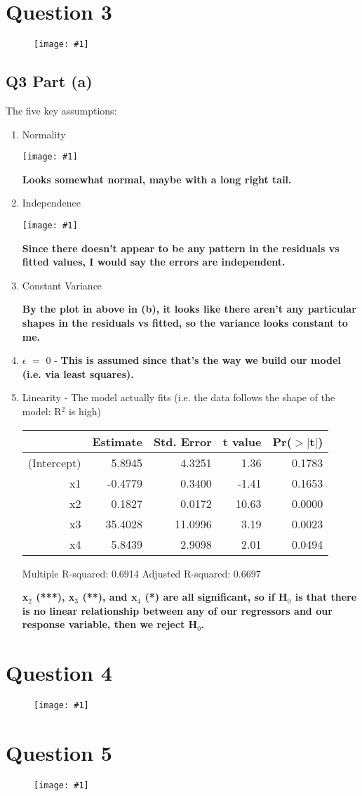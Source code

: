\documentclass{article}
\newcommand{\mt}[1]{\ensuremath{#1}}
\newcommand\bsc[2][\DefaultOpt]{%
  \def\DefaultOpt{#2}%
  \section[#1]{#2}%
}
\newcommand\ssc[2][\DefaultOpt]{%
  \def\DefaultOpt{#2}%
  \subsection[#1]{#2}%
}
\newcommand{\balist}{\begin{enumerate}[label=\alph*.]}
\newcommand{\elist}{\end{enumerate}}
\newcommand{\eql}{ \mt{\operatorname{=}} }
\newcommand{\uw}[2]{#1\mt{_{#2}}}
\newcommand{\txt}[1]{\text{#1}} %
\newcommand{\exv}[1]{\txt{E[}#1\txt{]}}
\newcommand{\simg}[1]{
  \texttt{[image: \#1]}
}
\newcommand{\wimg}[1]{
\begin{figure}[h]
  \texttt{[image: \#1]}
\end{figure}
}
\newcommand\tab[1][1cm]{\hspace*{#1}}
\begin{document}
\bsc{Question 3}{
\wimg{HW6Q3}

\ssc{Q3 Part (a)}{
The five key assumptions:

\balist
\item Normality

\simg{HW6Q3PAHist}

\textbf{Looks somewhat normal, maybe with a long right tail.}

\item Independence

\simg{HW6Q3PARes}

\textbf{Since there doesn't appear to be any pattern in the residuals vs fitted values, I would say the errors are independent.}

\item Constant Variance

\textbf{By the plot in above in (b), it looks like there aren't any particular shapes in the residuals vs fitted, so the variance looks constant to me.}

\item \exv{$\epsilon$} \eql 0 - \textbf{This is assumed since that's the way we build our model (i.e. via least squares).}

\item Linearity - The model actually fits (i.e. the data follows the shape of the model: R$^2$ is high)

\begin{table}[ht]
\centering
\begin{tabular}{rrrrr}
  \hline
 & Estimate & Std. Error & t value & Pr($>$$|$t$|$) \\ 
  \hline
(Intercept) & 5.8945 & 4.3251 & 1.36 & 0.1783 \\ 
  x1 & -0.4779 & 0.3400 & -1.41 & 0.1653 \\ 
  x2 & 0.1827 & 0.0172 & 10.63 & 0.0000 \\ 
  x3 & 35.4028 & 11.0996 & 3.19 & 0.0023 \\ 
  x4 & 5.8439 & 2.9098 & 2.01 & 0.0494 \\ 
   \hline
\end{tabular}
\end{table}

Multiple R-squared:  0.6914 \tab 	Adjusted R-squared:  0.6697

\textbf{\uw{x}{2} (***), \uw{x}{3} (**), and \uw{x}{4} (*) are all significant, so if \uw{H}{0} is that there is no linear relationship between any of our regressors and our response variable, then we reject \uw{H}{0}.}

\elist

}
}

\bsc{Question 4}{
\wimg{HW6Q4}
}
\bsc{Question 5}{
\wimg{HW6Q5}
}
\end{document}
